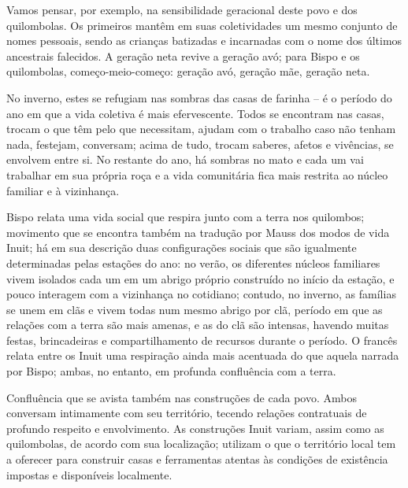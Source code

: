 Vamos pensar, por exemplo, na sensibilidade geracional deste povo e dos quilombolas. Os primeiros mantêm  em suas coletividades  um mesmo conjunto de nomes pessoais, sendo as  crianças batizadas e incarnadas com o nome dos últimos ancestrais  falecidos. A geração neta revive a geração avó; para Bispo e os quilombolas, começo-meio-começo: geração avó, geração mãe, geração neta.

No inverno, estes se refugiam nas sombras das casas de farinha -- é o período do ano em que a vida coletiva é mais efervescente. Todos se encontram nas casas, trocam o que têm pelo que necessitam, ajudam com o trabalho caso não tenham nada, festejam, conversam; acima de tudo, trocam saberes, afetos e vivências, se envolvem entre si. No restante do ano, há sombras no mato e cada um vai trabalhar em sua própria roça e a vida comunitária fica mais restrita ao núcleo familiar e à vizinhança.

Bispo relata uma vida social que respira junto com a terra nos quilombos; movimento que se encontra também na tradução por Mauss dos modos de vida Inuit; há em sua descrição duas configurações sociais que são igualmente determinadas pelas estações do ano: no verão, os diferentes núcleos familiares vivem isolados cada um em um abrigo próprio construído no início da estação, e pouco interagem com a vizinhança no cotidiano; contudo, no inverno, as famílias se unem em clãs e vivem todas num mesmo abrigo por clã, período em que as relações com a terra são mais amenas, e as do clã são intensas, havendo muitas festas, brincadeiras e compartilhamento de recursos durante o período. O francês relata entre os Inuit uma respiração ainda mais acentuada do que aquela narrada por Bispo; ambas, no entanto, em profunda confluência com a terra.

Confluência que se avista também nas construções de cada povo. Ambos conversam intimamente com seu território, tecendo relações contratuais de profundo respeito e envolvimento. As construções Inuit variam, assim como as quilombolas, de acordo com sua localização; utilizam o que o território local tem a oferecer para construir casas e ferramentas atentas às condições de existência impostas e disponíveis localmente.

